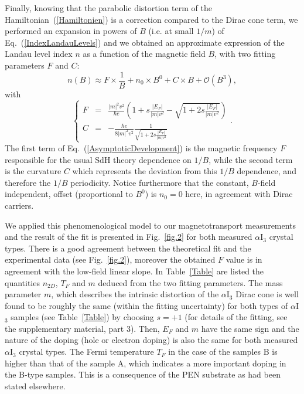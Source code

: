 \documentclass[doublecol]{epl2}
\begin{document}
Finally, knowing that the parabolic distortion term of the Hamiltonian~(\ref{Hamiltonien}) is a correction compared to the Dirac cone term, we performed an expansion in powers of $B$ (i.e. at small $1/m$) of Eq.~(\ref{IndexLandauLevels}) and we obtained an approximate expression of the Landau level index $n$ as a function of the magnetic field $B$, with two fitting parameters $F$ and $C$:
\begin{equation}
n(B)\approx F\times \frac{1}{B}+ n_0 \times B^0 + C\times B + \mathcal{O}(B^{3}), 
\label{AsymptoticDevelopment}
\end{equation}
with
\begin{equation}
\left\lbrace
\begin{array}{lll}
F%
&=&\frac{\left|m\right|^2v^2}{\hbar e}\left(1+s\frac{\left|E_{F}\right|}{\left|m\right|v^2}-\sqrt{1+2s\frac{\left|E_{F}\right|}{\left|m\right|v^2}}\right)\\[0.4cm]
C %
&=&-\frac{\hbar e}{8\left|m\right|^2v^2}\frac{1}{\sqrt{1+2s\frac{\left|E_{F}\right|}{\left|m\right|v^2}}}
\end{array}
\right. .
\label{parametersFit}
\end{equation}
The first term of Eq.~(\ref{AsymptoticDevelopment}) is the magnetic frequency $F$ responsible for the usual SdH theory dependence on $1/B$, while the second
term is the curvature $C$ which represents the deviation from this $1/B$ dependence, and therefore the $1/B$ periodicity. Notice furthermore that the constant, $B$-field independent, 
offset (proportional to $B^0$) is $n_0=0$ here, in agreement with Dirac carriers. 

We applied this phenomenological model to our magnetotransport measurements and the result of the fit is presented in Fig.~\ref{fig.2} for both measured $\alpha$I$_{3}$ 
crystal types. There is a good agreement between the theoretical fit and the experimental data (see Fig.~\ref{fig.2}), moreover the obtained $F$ value is 
in agreement with the low-field linear slope. In Table~\ref{Table} are listed the quantities $n_{2D}$, $T_{F}$ and $m$ deduced from the two fitting parameters. 
The mass parameter $m$, which describes the intrinsic distortion of the $\alpha$I$_{3}$ Dirac cone is well found to be roughly the same (within the fitting uncertainty) 
for both types of $\alpha$I$_{3}$ samples (see Table~\ref{Table}) by choosing $s=+1$ (for details of the fitting, see the supplementary material, part $3$). 
Then, $E_{F}$ and $m$ have the same sign and the nature of the doping (hole or electron doping) is also the same for both measured $\alpha$I$_{3}$ crystal types. 
The Fermi temperature $T_{F}$ in the case of the samples B is higher than that of the sample A, which indicates a more important doping in the B-type samples. This is 
a consequence of the PEN substrate as had been stated elsewhere\cite{alphaSdHOscillations}.     
\end{document}
